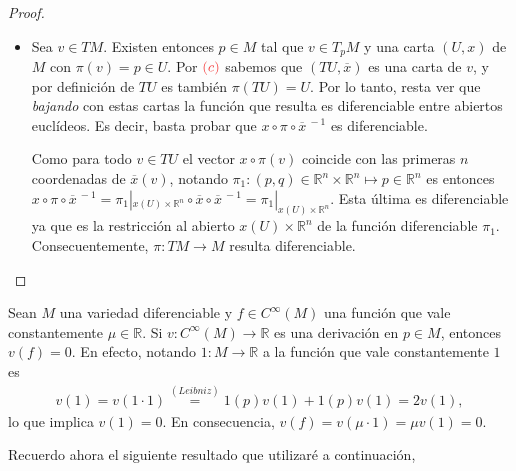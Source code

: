 \documentclass[11pt]{article}
\newcommand{\R}{\mathbb{R}}
\newcommand{\paint}[2]{\color{#1}{#2}}
\newcommand{\ol}{\overline}
\newenvironment{obs}[2][Observaci\'on]{\begin{trivlist}
\item[\hskip \labelsep \paint{red}{{\bfseries #1.}}]}{\end{trivlist}}
\begin{document}
\begin{proof}
\begin{itemize}
\item[(d)] Sea $v \in TM$. Existen entonces $p \in M$ tal que $v \in T_pM$ y una carta $(U,x)$ de $M$ con $\pi(v) = p \in U$. Por $\paint{red}{(c)}$ sabemos que $(TU, \ol{x})$ es una carta de $v$, y por definici\'on de $TU$ es tambi\'en $\pi(TU) = U$. Por lo tanto, resta ver que \textit{bajando} con estas cartas la funci\'on que resulta es diferenciable entre abiertos eucl\'ideos. Es decir, basta probar que $x\circ \pi \circ \ol{x}^{\ -1}$ es diferenciable.
\begin{center}
\end{center}
Como para todo $v \in TU$ el vector $x \circ \pi(v)$ coincide con las primeras $n$ coordenadas de $\ol{x}(v)$, notando $\pi_1 : (p,q) \in \R^n \times \R^n \mapsto p \in \R^n$ es entonces $x\circ \pi \circ \ol{x}^{\ -1} = \pi_1|_{x(U) \times \R^n} \circ \ol{x} \circ \ol{x}^{\ -1}  = \pi_1|_{x(U) \times \R^n}$. Esta \'ultima es diferenciable ya que es la restricci\'on al abierto $x(U) \times \R^n$ de la funci\'on diferenciable $\pi_1$. Consecuentemente, $\pi : TM \to M$ resulta diferenciable.
\end{itemize}
\end{proof}

\begin{obs}{} Sean $M$ una variedad diferenciable y $f \in C^\infty(M)$ una funci\'on que vale constantemente $\mu \in \R$. Si $v : C^\infty(M) \to \R$ es una derivaci\'on en $p \in M$, entonces $v(f) = 0$. En efecto, notando $1 : M \to \R$ a la funci\'on que vale constantemente $1$ es
\begin{align*}
v(1) = v(1 \cdot 1) \stackrel{(Leibniz)}{=} 1(p)v(1) + 1(p)v(1) = 2v(1),
\end{align*}
lo que implica $v(1) = 0$. En consecuencia, $v(f) = v(\mu \cdot 1) = \mu v(1) = 0$.
\end{obs}

Recuerdo ahora el siguiente resultado que utilizar\'e a continuaci\'on,
\end{document}
